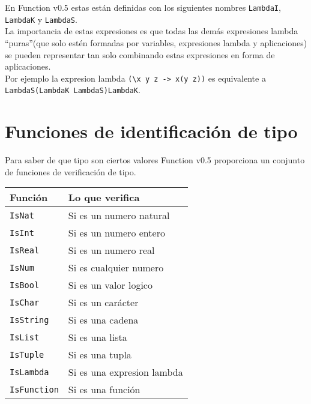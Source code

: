       En Function v0.5 estas están definidas con los siguientes nombres \texttt{LambdaI}, \texttt{LambdaK} y \texttt{LambdaS}.
      \\
      
      La importancia de estas expresiones es que todas las demás expresiones lambda ``puras''(que solo estén formadas por variables, expresiones lambda y aplicaciones) se pueden representar tan solo combinando estas expresiones en forma de aplicaciones.
      \\
      
      Por ejemplo la expresion lambda \texttt{(\textbackslash x y z ->~x(y z))} es equivalente a \texttt{LambdaS(LambdaK LambdaS)LambdaK}.
      
   \section{Funciones de identificación de tipo}
      Para saber de que tipo son ciertos valores Function v0.5 proporciona un conjunto de funciones de verificación de tipo.
      
      \begin{longtable}[c]{ll}
         {\bf Función} & {\bf Lo que verifica}\\ \hline
         \texttt{IsNat}      & Si es un numero natural\\   
         \texttt{IsInt}      & Si es un numero entero\\
         \texttt{IsReal}     & Si es un numero real\\
         \texttt{IsNum}      & Si es cualquier numero\\
         \texttt{IsBool}     & Si es un valor logico\\
         \texttt{IsChar}     & Si es un carácter\\
         \texttt{IsString}   & Si es una cadena   \\ 
         \texttt{IsList}     & Si es una lista\\
         \texttt{IsTuple}    & Si es una tupla\\
         \texttt{IsLambda}   & Si es una expresion lambda\\
         \texttt{IsFunction} & Si es una función\\
      \end{longtable}
   
   
   
   
   
   
   
   
   
   
